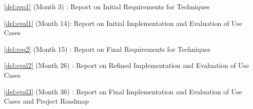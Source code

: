 \begin{Workpackage}{\thewpno}
%  

\begin{WPDeliverables}
  \begin{compactitem}
\item \ref{del:req1} (Month 3) : Report on Initial Requirements for \TheProject{} Techniques
\item \ref{del:eval1} (Month 14): Report on Initial Implementation and Evaluation of Use Cases
\item \ref{del:req2} (Month 15) : Report on Final Requirements for \TheProject{} Techniques
\item \ref{del:eval2} (Month 26) : Report on Refined Implementation and Evaluation of Use Cases
\item \ref{del:eval3} (Month 36) : Report on Final Implementation and Evaluation of Use Cases and Project Roadmap
\end{compactitem}
\end{WPDeliverables}
\end{Workpackage}
